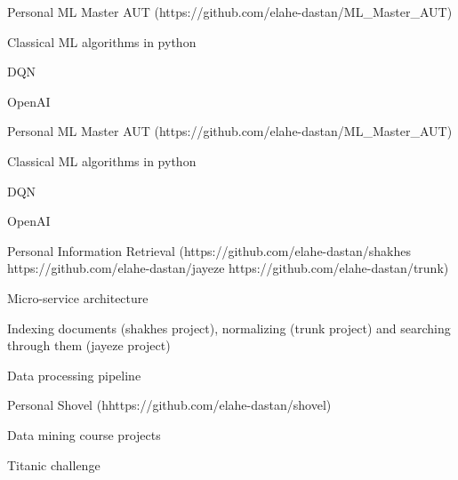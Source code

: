 \begin{cventries}
    \cventry
    {Personal} %
    {ML Master AUT ({\tiny https://github.com/elahe-dastan/ML\_Master\_AUT})} %
    {} %
    {} %
    {
      \begin{cvitems} %
        \item{Classical ML algorithms in python}
        \item{DQN}
        \item{OpenAI}
      \end{cvitems}
    }

    \cventry
    {Personal} %
    {ML Master AUT ({\tiny https://github.com/elahe-dastan/ML\_Master\_AUT})} %
    {} %
    {} %
    {
      \begin{cvitems} %
        \item{Classical ML algorithms in python}
        \item{DQN}
        \item{OpenAI}
      \end{cvitems}
    }

    \cventry
    {Personal} %
    {Information Retrieval ({\tiny https://github.com/elahe-dastan/shakhes} {\tiny https://github.com/elahe-dastan/jayeze} {\tiny https://github.com/elahe-dastan/trunk})} %
    {} %
    {} %
    {
      \begin{cvitems} %
        \item{Micro-service architecture}
        \item{Indexing documents (shakhes project), normalizing (trunk project) and searching through them (jayeze project)}
        \item{Data processing pipeline}
      \end{cvitems}
    }

    \cventry
    {Personal} %
    {Shovel ({\tiny hhttps://github.com/elahe-dastan/shovel})} %
    {} %
    {} %
    {
      \begin{cvitems} %
        \item{Data mining course projects}
        \item{Titanic challenge}
      \end{cvitems}
    }


\end{cventries}
